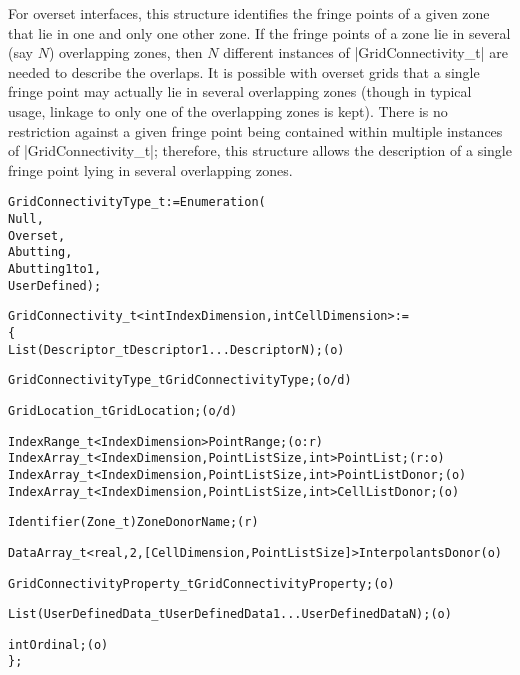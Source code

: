 For overset interfaces, this structure identifies the fringe points of
a given zone that lie in one and only one other zone.  If the fringe
points of a zone lie in several (say $N$) overlapping zones, then $N$
different instances of |GridConnectivity_t| are needed to describe the
overlaps.  It is possible with overset grids that a single fringe point
may actually lie in several overlapping zones (though in typical usage,
linkage to only one of the overlapping zones is kept).  There is no
restriction against a given fringe point being contained within multiple
instances of |GridConnectivity_t|; therefore, this structure allows the
description of a single fringe point lying in several overlapping zones.

\begin{alltt}
  GridConnectivityType\_t := Enumeration(
    Null,
    Overset,
    Abutting,
    Abutting1to1,
    UserDefined ) ;

  GridConnectivity\_t< int IndexDimension, int CellDimension > :=
    \{
    List( Descriptor\_t Descriptor1 ... DescriptorN ) ;                      (o)

    GridConnectivityType\_t GridConnectivityType ;                           (o/d)

    GridLocation\_t GridLocation ;                                           (o/d)

    IndexRange\_t<IndexDimension> PointRange ;                               (o:r)
    IndexArray\_t<IndexDimension, PointListSize, int>  PointList ;           (r:o)
    IndexArray\_t<IndexDimension, PointListSize, int>  PointListDonor ;      (o)
    IndexArray\_t<IndexDimension, PointListSize, int>  CellListDonor ;       (o)

    Identifier(Zone\_t) ZoneDonorName ;                                      (r)

    DataArray\_t <real, 2, [CellDimension, PointListSize]> InterpolantsDonor (o)

    GridConnectivityProperty\_t GridConnectivityProperty ;                   (o)

    List( UserDefinedData\_t UserDefinedData1 ... UserDefinedDataN ) ;       (o)

    int Ordinal ;                                                           (o)
    \} ;
\end{alltt}


